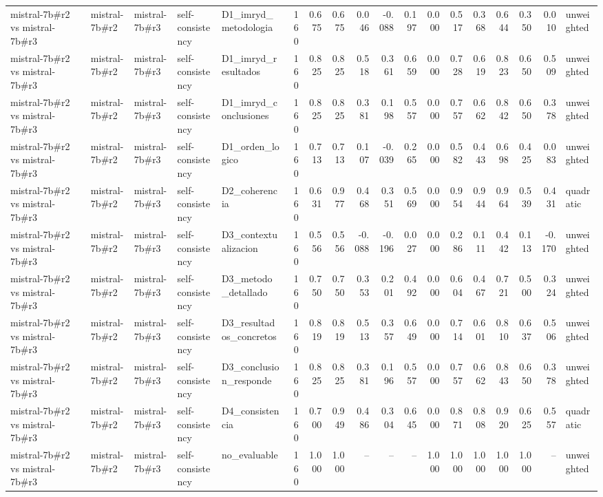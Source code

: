 \begin{table}
{\begin{tabular}{lllllrrrrrrrrrrrrl}
mistral-7b\#r2 vs mistral-7b\#r3 & mistral-7b\#r2 & mistral-7b\#r3 & self-consistency & D1\_imryd\_metodologia & 160 & 0.675 & 0.675 & 0.046 & -0.088 & 0.197 & 0.000 & 0.517 & 0.368 & 0.644 & 0.350 & 0.010 & unweighted \\
mistral-7b\#r2 vs mistral-7b\#r3 & mistral-7b\#r2 & mistral-7b\#r3 & self-consistency & D1\_imryd\_resultados & 160 & 0.825 & 0.825 & 0.518 & 0.361 & 0.659 & 0.000 & 0.728 & 0.619 & 0.823 & 0.650 & 0.509 & unweighted \\
mistral-7b\#r2 vs mistral-7b\#r3 & mistral-7b\#r2 & mistral-7b\#r3 & self-consistency & D1\_imryd\_conclusiones & 160 & 0.825 & 0.825 & 0.381 & 0.198 & 0.557 & 0.000 & 0.757 & 0.662 & 0.842 & 0.650 & 0.378 & unweighted \\
mistral-7b\#r2 vs mistral-7b\#r3 & mistral-7b\#r2 & mistral-7b\#r3 & self-consistency & D1\_orden\_logico & 160 & 0.713 & 0.713 & 0.107 & -0.039 & 0.265 & 0.000 & 0.582 & 0.443 & 0.698 & 0.425 & 0.083 & unweighted \\
mistral-7b\#r2 vs mistral-7b\#r3 & mistral-7b\#r2 & mistral-7b\#r3 & self-consistency & D2\_coherencia & 160 & 0.631 & 0.977 & 0.468 & 0.351 & 0.569 & 0.000 & 0.954 & 0.944 & 0.964 & 0.539 & 0.431 & quadratic \\
mistral-7b\#r2 vs mistral-7b\#r3 & mistral-7b\#r2 & mistral-7b\#r3 & self-consistency & D3\_contextualizacion & 160 & 0.556 & 0.556 & -0.088 & -0.196 & 0.027 & 0.000 & 0.286 & 0.111 & 0.442 & 0.113 & -0.170 & unweighted \\
mistral-7b\#r2 vs mistral-7b\#r3 & mistral-7b\#r2 & mistral-7b\#r3 & self-consistency & D3\_metodo\_detallado & 160 & 0.750 & 0.750 & 0.353 & 0.201 & 0.492 & 0.000 & 0.604 & 0.467 & 0.721 & 0.500 & 0.324 & unweighted \\
mistral-7b\#r2 vs mistral-7b\#r3 & mistral-7b\#r2 & mistral-7b\#r3 & self-consistency & D3\_resultados\_concretos & 160 & 0.819 & 0.819 & 0.513 & 0.357 & 0.649 & 0.000 & 0.714 & 0.601 & 0.810 & 0.637 & 0.506 & unweighted \\
mistral-7b\#r2 vs mistral-7b\#r3 & mistral-7b\#r2 & mistral-7b\#r3 & self-consistency & D3\_conclusion\_responde & 160 & 0.825 & 0.825 & 0.381 & 0.196 & 0.557 & 0.000 & 0.757 & 0.662 & 0.843 & 0.650 & 0.378 & unweighted \\
mistral-7b\#r2 vs mistral-7b\#r3 & mistral-7b\#r2 & mistral-7b\#r3 & self-consistency & D4\_consistencia & 160 & 0.700 & 0.949 & 0.486 & 0.304 & 0.645 & 0.000 & 0.871 & 0.808 & 0.920 & 0.625 & 0.557 & quadratic \\
mistral-7b\#r2 vs mistral-7b\#r3 & mistral-7b\#r2 & mistral-7b\#r3 & self-consistency & no\_evaluable & 160 & 1.000 & 1.000 & -- & -- & -- & 1.000 & 1.000 & 1.000 & 1.000 & 1.000 & -- & unweighted \\

\end{tabular}}
\end{table}
